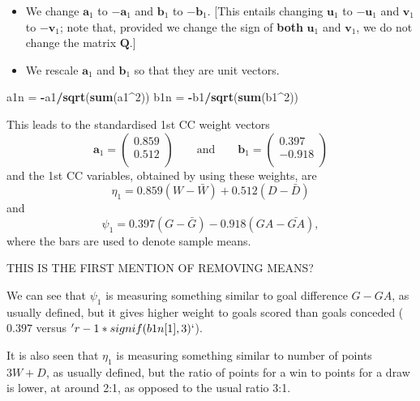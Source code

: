 \documentclass[]{book}
\newenvironment{Shaded}{\begin{snugshade}}{\end{snugshade}}
\newcommand{\DecValTok}[1]{\textcolor[rgb]{0.00,0.00,0.81}{#1}}
\newcommand{\KeywordTok}[1]{\textcolor[rgb]{0.13,0.29,0.53}{\textbf{#1}}}
\newcommand{\NormalTok}[1]{#1}
\newcommand{\OperatorTok}[1]{\textcolor[rgb]{0.81,0.36,0.00}{\textbf{#1}}}
\newcommand{\StringTok}[1]{\textcolor[rgb]{0.31,0.60,0.02}{#1}}
\providecommand{\tightlist}{%
  \setlength{\itemsep}{0pt}\setlength{\parskip}{0pt}}
\theoremstyle{definition}
\theoremstyle{definition}
\theoremstyle{definition}
\theoremstyle{remark}
\begin{document}
\begin{itemize}
\tightlist
\item
  We change \(\boldsymbol a_1\) to \(-\boldsymbol a_1\) and \(\boldsymbol b_1\) to \(-\boldsymbol b_1\). {[}This entails changing \(\boldsymbol u_1\) to \(-\boldsymbol u_1\) and \(\boldsymbol v_1\) to \(-\boldsymbol v_1\); note that, provided we change the sign of \textbf{both} \(\boldsymbol u_1\) and \(\boldsymbol v_1\), we do not change the matrix \(\boldsymbol Q\).{]}
\item
  We rescale \(\boldsymbol a_1\) and \(\boldsymbol b_1\) so that they are unit vectors.
\end{itemize}

\begin{Shaded}
\begin{Highlighting}[]
\NormalTok{a1n =}\StringTok{ }\OperatorTok{-}\NormalTok{a1}\OperatorTok{/}\KeywordTok{sqrt}\NormalTok{(}\KeywordTok{sum}\NormalTok{(a1}\OperatorTok{^}\DecValTok{2}\NormalTok{))}
\NormalTok{b1n =}\StringTok{ }\OperatorTok{-}\NormalTok{b1}\OperatorTok{/}\KeywordTok{sqrt}\NormalTok{(}\KeywordTok{sum}\NormalTok{(b1}\OperatorTok{^}\DecValTok{2}\NormalTok{))}
\end{Highlighting}
\end{Shaded}

This leads to the standardised 1st CC weight vectors
\[
\boldsymbol a_1=\begin{pmatrix}0.859 \\0.512 \\\end{pmatrix} \qquad \text{and} \qquad
\boldsymbol b_1=\begin{pmatrix}0.397 \\-0.918 \\\end{pmatrix}
\]
and the 1st CC variables, obtained by using these weights, are
\[
\eta_1 =0.859 (W-\bar{W}) +0.512(D -\bar{D})
\]
and
\[
 \psi_1 = 0.397(G-\bar{G}) -0.918(GA-\bar{GA}),
\]
where the bars are used to denote sample means.

THIS IS THE FIRST MENTION OF REMOVING MEANS?

We can see that \(\psi_1\) is measuring something similar to goal difference \(G-GA\), as usually defined, but it gives higher weight to goals scored than goals conceded (\(0.397\) versus \('r -1*signif(b1n[1],3)`\)).

It is also seen that \(\eta_1\) is measuring something similar to number of points \(3W+D\), as usually defined, but the ratio of points for a win to points for a draw is lower, at around 2:1, as opposed to the usual ratio 3:1.
\end{document}
